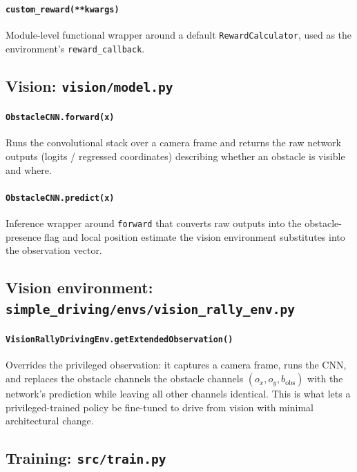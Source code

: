 \documentclass[11pt]{article}
\begin{document}
\paragraph{\texttt{custom\_reward(**kwargs)}}
Module-level functional wrapper around a default \texttt{RewardCalculator},
used as the environment's \texttt{reward\_callback}.

\subsection{Vision: \texttt{vision/model.py}}

\paragraph{\texttt{ObstacleCNN.forward(x)}}
Runs the convolutional stack over a camera frame and returns the raw network
outputs (logits / regressed coordinates) describing whether an obstacle is
visible and where.

\paragraph{\texttt{ObstacleCNN.predict(x)}}
Inference wrapper around \texttt{forward} that converts raw outputs into the
obstacle-presence flag and local position estimate the vision environment
substitutes into the observation vector.

\subsection{Vision environment: \texttt{simple\_driving/envs/vision\_rally\_env.py}}

\paragraph{\texttt{VisionRallyDrivingEnv.getExtendedObservation()}}
Overrides the privileged observation: it captures a camera frame, runs the
CNN, and replaces the obstacle channels the obstacle channels $(o_x, o_y, b_{\text{obs}})$
with the network's prediction while leaving all other channels identical. This
is what lets a privileged-trained policy be fine-tuned to drive from vision
with minimal architectural change.

\subsection{Training: \texttt{src/train.py}}
\end{document}
